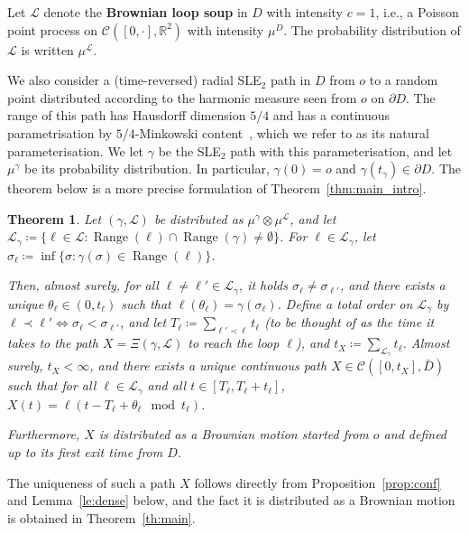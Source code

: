 \documentclass[11pt]{article}
\newtheorem{theorem}{Theorem}[section]
\def\cL{{\mathcal L}}
\DeclareMathOperator{\Range}{Range}
\def\Att{{\Xi}}
\begin{document}
Let $\cL$ denote the \textbf{Brownian loop soup} in $D$ with intensity $c = 1$, i.e., a Poisson point process on $\mathcal{C}([0,\cdot], \mathbb{R}^2)$ with intensity $\mu^D$. The probability distribution of $\cL$ is written $\mu^{\mathcal{L}}$.
\medskip

We also consider a (time-reversed) radial SLE$_2$ path in $D$ from $o$ to a random point distributed according to the harmonic measure seen from $o$ on $\partial D$. The range of this path has Hausdorff dimension $5/4$ and has a continuous parametrisation by $5/4$-Minkowski content~\cite[Theorem 1.1]{LawlerRezaei}, which we refer to as its natural parameterisation. %
We let $\gamma$ be the SLE$_2$ path with this parameterisation, and let $\mu^\gamma$ be its probability distribution. In particular, $\gamma(0)=o$ and $\gamma(t_\gamma)\in \partial D$.  The theorem below is a more precise formulation of Theorem~\ref{thm:main_intro}.
\begin{theorem}\label{th:main_precise}
    Let $(\gamma,\mathcal{L})$ be distributed as $\mu^\gamma\otimes \mu^{\mathcal{L}}$, and let $\mathcal{L}_\gamma\coloneqq \{ \ell \in \mathcal{L}: \Range(\ell)\cap \Range(\gamma)\neq \emptyset\}$.
    For $\ell \in \mathcal{L}_\gamma$, let $\sigma_\ell\coloneqq \inf\{\sigma: \gamma(\sigma) \in \Range(\ell) \}$.

    Then, almost surely, for all $\ell\neq \ell'\in  \mathcal{L}_\gamma$, it holds $\sigma_\ell\neq \sigma_{\ell'}$, and there exists a unique $\theta_\ell\in (0, t_\ell)$ such that $\ell(\theta_\ell)= \gamma(\sigma_\ell)$.
    Define a total order on $\cL_\gamma$ by $\ell \prec \ell'\iff \sigma_\ell<\sigma_{\ell'}$, and let $T_\ell\coloneqq \sum_{\ell'\prec \ell} t_\ell$ (to be thought of as the time it takes to the path $X=\Att(\gamma,\mathcal{L})$ to reach the loop $\ell$), and $t_X\coloneqq \sum_{\cL_\gamma} t_\ell$.
    Almost surely, $t_X<\infty$, and there exists a unique continuous path $X\in \mathcal{C}([0,t_X],\bar{D})$ such that for all $\ell \in \mathcal{L}_\gamma$ and all $t\in [T_\ell,T_\ell+t_\ell]$, $X(t)= \ell(   t-T_\ell+\theta_\ell \mod t_\ell)$.

    Furthermore, $X$ is distributed as a Brownian motion started from $o$ and defined up to its first exit time from $D$.
\end{theorem}
The uniqueness of such a path $X$ follows directly from Proposition~\ref{prop:conf} and Lemma~\ref{le:dense} below, and the fact it is distributed as a Brownian motion is obtained in Theorem~\ref{th:main}.
\end{document}
